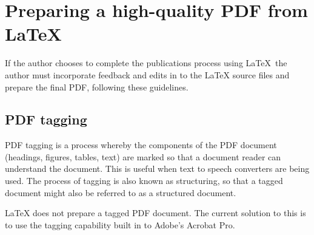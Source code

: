 \chapter{Preparing a high-quality PDF from LaTeX}\label{sec:PDFprep}
If the author chooses to complete the publications process using LaTeX\, the author must incorporate feedback and edits in to the LaTeX source files and prepare the final PDF, following these guidelines.

\section{PDF tagging}\label{sec:PDFtagging}
PDF tagging is a process whereby the components of the PDF document (headings, figures, tables, text) are marked so that a document reader can understand the document. This is useful when text to speech converters are being used. The process of tagging is also known as structuring, so that a tagged document might also be referred to as a structured document.

LaTeX does not prepare a tagged PDF document. The current solution to this is to use the tagging capability built in to Adobe's Acrobat Pro.

